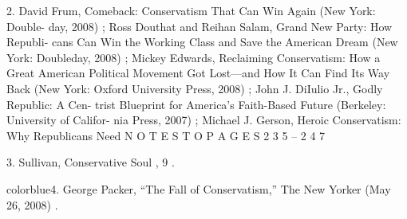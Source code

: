 	{\color{blue}2}. David Frum, Comeback: Conservatism That Can Win Again (New York: Double- day, 2008) ; Ross Douthat and Reihan Salam, Grand New Party: How Republi- cans Can Win the Working Class and Save the American Dream (New York: Doubleday, 2008) ; Mickey Edwards, Reclaiming Conservatism: How a Great American Political Movement Got Lost—and How It Can Find Its Way Back (New York: Oxford University Press, 2008) ; John J. DiIulio Jr., Godly Republic: A Cen- trist Blueprint for America’s Faith-Based Future (Berkeley: University of Califor- nia Press, 2007) ; Michael J. Gerson, Heroic Conservatism: Why Republicans Need N O T E S T O P A G E S 2 3 5 – 2 4 7


	{\color{blue}3}. Sullivan, Conservative Soul , 9 .


	{color{blue}4}. George Packer, “The Fall of Conservatism,” The New Yorker (May 26, 2008) .